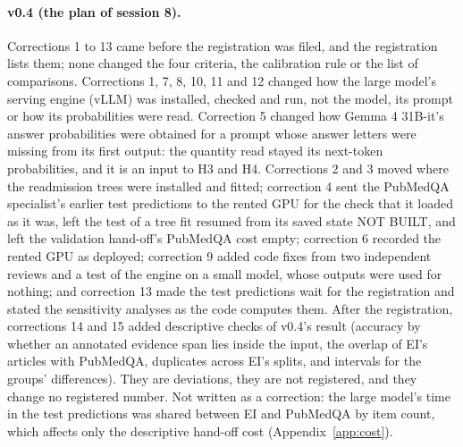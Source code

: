 \documentclass[11pt,letterpaper]{article}
\newcommand{\idn}[1]{#1}%
\begin{document}
\paragraph{v0.4 (the plan of session \idn{8}).} Corrections \idn{1} to \idn{13} came before the registration was filed, and the registration lists them; none changed the four criteria, the calibration rule or the list of comparisons. Corrections \idn{1}, \idn{7}, \idn{8}, \idn{10}, \idn{11} and \idn{12} changed how the large model's serving engine (vLLM) was installed, checked and run, not the model, its prompt or how its probabilities were read. Correction \idn{5} changed how Gemma 4 31B-it's answer probabilities were obtained for a prompt whose answer letters were missing from its first output: the quantity read stayed its next-token probabilities, and it is an input to H3 and H4. Corrections \idn{2} and \idn{3} moved where the readmission trees were installed and fitted; correction \idn{4} sent the PubMedQA specialist's earlier test predictions to the rented GPU for the check that it loaded as it was, left the test of a tree fit resumed from its saved state NOT BUILT, and left the validation hand-off's PubMedQA cost empty; correction \idn{6} recorded the rented GPU as deployed; correction \idn{9} added code fixes from two independent reviews and a test of the engine on a small model, whose outputs were used for nothing; and correction \idn{13} made the test predictions wait for the registration and stated the sensitivity analyses as the code computes them. After the registration, corrections \idn{14} and \idn{15} added descriptive checks of v0.4's result (accuracy by whether an annotated evidence span lies inside the input, the overlap of EI's articles with PubMedQA, duplicates across EI's splits, and intervals for the groups' differences). They are deviations, they are not registered, and they change no registered number. Not written as a correction: the large model's time in the test predictions was shared between EI and PubMedQA by item count, which affects only the descriptive hand-off cost (Appendix~\ref{app:cost}).
\end{document}
